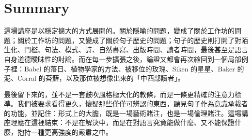 \section{Summary}

這場講座是以穩定擴大的方式展開的。關於隱喻的問題，變成了關於工作坊的問題；關於工作坊的問題，又變成了關於句子歷史的問題；句子的歷史則打開了對陌生化、門檻、句法、模式、詩、自然書寫、出版時間、讀者時間，最後甚至是語言自身道德曖昧性的討論。而在每一步擴張之後，論證又都會再次縮回到一個局部例子裡：Babel 的落日、植物學家的方法、被移位的玫瑰、Siken 的星星、Baker 的泥、Corral 的苔蘚，以及那位被想像出來的「中西部讀者」。

最後留下來的，並不是一套鼓吹風格極大化的教條，而是一條更精確的注意力標準。我們被要求看得更久，懷疑那些僅僅可辨認的東西，聽見句子作為意識承載者的功能，並記住：形式上的大膽，既是一場藝術賭注，也是一場倫理賭注。這場講座理應在這裡結束：不是在解決中，而是在對語言究竟能做什麼、又不能保證什麼，抱持一種更高強度的嚴肅之中。